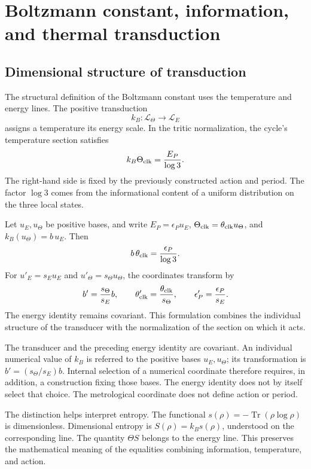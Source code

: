 \section{Boltzmann constant, information, and thermal transduction}
\label{ii:sec:ii-boltzmann}

\subsection{Dimensional structure of transduction}

The structural definition of the Boltzmann constant uses the
temperature and energy lines. The positive transduction
\[
 k_B:\mathcal L_\Theta\longrightarrow\mathcal L_E
\]
assigns a temperature its energy scale. In the tritic
normalization, the cycle's temperature section satisfies
\[
 k_B\Theta_{\rm clk}=\frac{E_P}{\log3}.
\]
The right-hand side is fixed by the previously constructed action and
period. The factor \(\log3\) comes from the informational content
of a uniform distribution on the three local states.

Let \(u_E,u_\Theta\) be positive bases, and write
\(E_P=\epsilon_Pu_E\), \(\Theta_{\rm clk}=\theta_{\rm clk}u_\Theta\),
and \(k_B(u_\Theta)=b\,u_E\). Then
\[
 b\,\theta_{\rm clk}=\frac{\epsilon_P}{\log3}.
\]
For \(u'_E=s_Eu_E\) and \(u'_\Theta=s_\Theta u_\Theta\),
the coordinates transform by
\[
 b'=\frac{s_\Theta}{s_E}b,\qquad
 \theta'_{\rm clk}=\frac{\theta_{\rm clk}}{s_\Theta},\qquad
 \epsilon'_P=\frac{\epsilon_P}{s_E}.
\]
The energy identity remains covariant. This formulation combines
the individual structure of the transducer with the normalization of the
section on which it acts.

\begin{remark}
The transducer and the preceding energy identity are covariant.
An individual numerical value of \(k_B\) is referred to the positive bases
\(u_E,u_\Theta\); its transformation is \(b'=(s_\Theta/s_E)b\).
Internal selection of a numerical coordinate therefore requires,
in addition, a construction fixing those bases. The energy identity
does not by itself select that choice. The metrological coordinate
does not define action or period.
\end{remark}

The distinction helps interpret entropy. The functional
\(s(\rho)=-\operatorname{Tr}(\rho\log\rho)\) is dimensionless.
Dimensional entropy is \(S(\rho)=k_Bs(\rho)\), understood on
the corresponding line. The quantity \(\Theta S\) belongs to
the energy line. This preserves the mathematical meaning of the
equalities combining information, temperature, and action.

